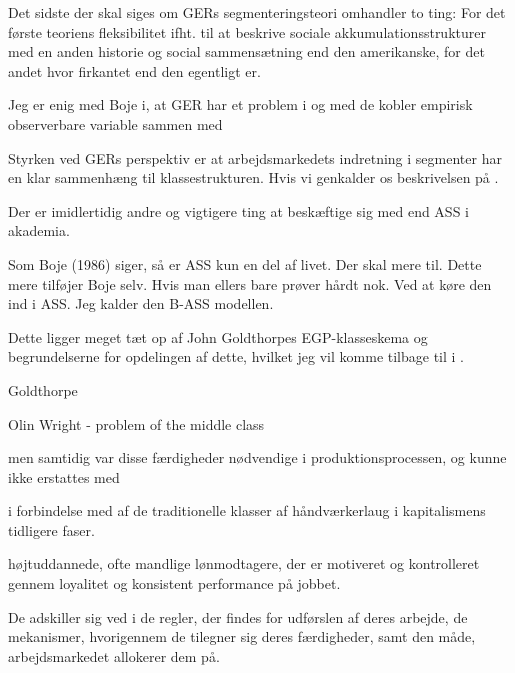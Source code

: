 Det sidste der skal siges om GERs segmenteringsteori omhandler to ting: For det første teoriens fleksibilitet ifht. til at beskrive sociale akkumulationsstrukturer med en anden historie og social sammensætning end den amerikanske, for det andet hvor firkantet end den egentligt er.  



Jeg er enig med Boje i, at GER har et problem i og med de kobler empirisk observerbare variable sammen med 



Styrken ved GERs perspektiv er at arbejdsmarkedets indretning i segmenter har en klar sammenhæng til klassestrukturen. Hvis vi genkalder os beskrivelsen på . 



Der er imidlertidig andre og vigtigere ting at beskæftige sig med end ASS i akademia. 

Som Boje (1986) siger, så er ASS kun en del af livet. Der skal mere til. Dette mere tilføjer Boje selv. Hvis man ellers bare prøver hårdt nok. Ved at køre den ind i ASS. Jeg kalder den B-ASS modellen.





Dette ligger meget tæt op af John Goldthorpes EGP-klasseskema og begrundelserne for opdelingen af dette, hvilket jeg vil komme tilbage til i .






Goldthorpe 

Olin Wright - problem of the middle class


 men samtidig var disse færdigheder nødvendige i produktionsprocessen, og kunne ikke erstattes med 


i forbindelse med  af de traditionelle klasser af håndværkerlaug i kapitalismens tidligere faser. 



højtuddannede, ofte mandlige lønmodtagere, der er motiveret og kontrolleret gennem loyalitet og konsistent performance på jobbet. 





De adskiller sig ved i de regler, der findes for udførslen af deres arbejde, de mekanismer, hvorigennem de tilegner sig deres færdigheder, samt den måde, arbejdsmarkedet allokerer dem på. 


 










